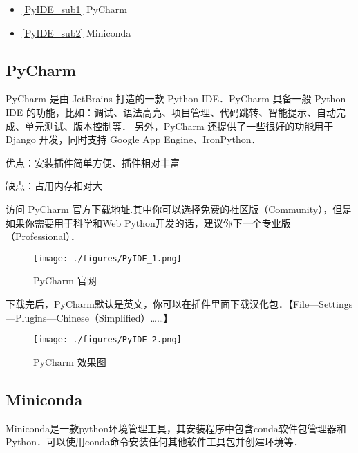 
\begin{issues}
\issueTODO
\end{issues}


\begin{itemize}
\item \autoref{PyIDE_sub1} PyCharm 
\item \autoref{PyIDE_sub2} Miniconda
\end{itemize} 

\subsection{PyCharm}\label{PyIDE_sub1}

PyCharm 是由 JetBrains 打造的一款 Python IDE．PyCharm 具备一般 Python IDE 的功能，比如：调试、语法高亮、项目管理、代码跳转、智能提示、自动完成、单元测试、版本控制等． 另外，PyCharm 还提供了一些很好的功能用于 Django 开发，同时支持 Google App Engine、IronPython．

优点：安装插件简单方便、插件相对丰富

缺点：占用内存相对大

访问 \href{http://www.jetbrains.com/pycharm/download/}{PyCharm 官方下载地址}.其中你可以选择免费的社区版（Community），但是如果你需要用于科学和Web Python开发的话，建议你下一个专业版（Professional）．

\begin{figure}[ht]
\centering
\texttt{[image: ./figures/PyIDE\_1.png]}
\caption{PyCharm 官网} \label{PyIDE_fig1}
\end{figure}

下载完后，PyCharm默认是英文，你可以在插件里面下载汉化包．【File—Settings—Plugins—Chinese（Simplified）……】

\begin{figure}[ht]
\centering
\texttt{[image: ./figures/PyIDE\_2.png]}
\caption{PyCharm 效果图} \label{PyIDE_fig2}
\end{figure}

\subsection{Miniconda}\label{PyIDE_sub2}

Miniconda是一款python环境管理工具，其安装程序中包含conda软件包管理器和Python．可以使用conda命令安装任何其他软件工具包并创建环境等．

